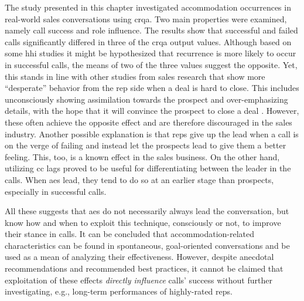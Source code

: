 The study presented in this chapter investigated accommodation occurrences in real-world sales conversations using \acf{crqa}.
Two main properties were examined, namely call success and role influence.
The results show that successful and failed calls significantly differed in three of the \ac{crqa} output values.
Although based on some \ac{hhi} studies it might be hypothesized that recurrence is more likely to occur in successful calls, the means of two of the three values suggest the opposite.
Yet, this stands in line with other studies from sales research that show more \enquote{desperate} behavior from the rep side when a deal is hard to close.
This includes unconsciously showing assimilation towards the prospect and over-emphasizing details, with the hope that it will convince the prospect to close a deal \citep{Orlob2018roi}.
However, these often achieve the opposite effect and are therefore discouraged in the sales industry.
Another possible explanation is that reps give up the lead when a call is on the verge of failing and instead let the prospects lead to give them a better feeling.
This, too, is a known effect in the sales business.
On the other hand, utilizing \acl{cc} lags proved to be useful for differentiating between the leader in the calls.
When \acfp{ae} lead, they tend to do so at an earlier stage than prospects, especially in successful calls.

All these suggests that \acp{ae} do not necessarily always lead the conversation, but know how and when to exploit this technique, consciously or not, to improve their stance in calls.
It can be concluded that accommodation-related characteristics can be found in spontaneous, goal-oriented conversations and be used as a mean of analyzing their effectiveness.
However, despite anecdotal recommendations and recommended best practices, it cannot be claimed that exploitation of these effects \emph{directly influence} calls' success without further investigating, e.g., long-term performances of highly-rated reps.


